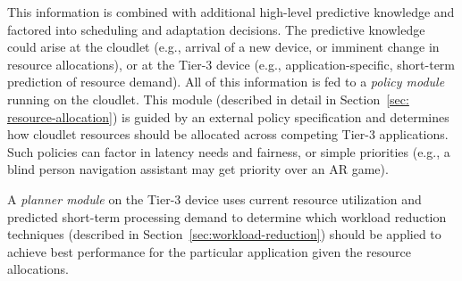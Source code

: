 This information is combined with additional high-level predictive
knowledge and factored into scheduling and adaptation decisions.  The
predictive knowledge could arise at the cloudlet (e.g., arrival of a
new device, or imminent change in resource allocations), or at the
Tier-3 device (e.g., application-specific, short-term prediction of
resource demand).  All of this information is fed to a {\em policy
  module} running on the cloudlet.  This module (described in detail
in Section~\ref{sec: resource-allocation}) is guided by an external
policy specification and determines how cloudlet resources should be
allocated across competing Tier-3 applications.  Such policies can
factor in latency needs and fairness, or simple priorities (e.g., a
blind person navigation assistant may get priority over an AR game).

A {\em planner module} on the Tier-3 device uses current resource
utilization and predicted short-term processing demand to determine
which workload reduction techniques (described in
Section~\ref{sec:workload-reduction}) should be applied to achieve
best performance for the particular application given the resource
allocations.

